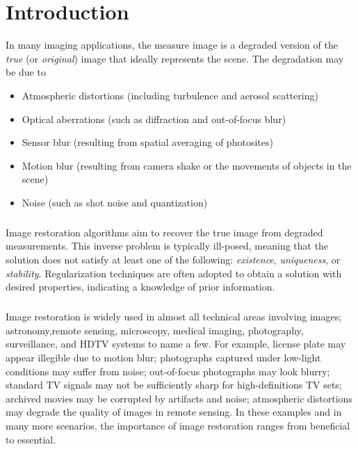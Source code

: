 \documentclass[a4paper]{book}
\begin{document}
	\chapter[\LARGE Introduction]{Introduction}
	\thispagestyle{empty}
	In many imaging applications, the measure image is a degraded version of the \textit{true} (or \textit{original}) image that ideally represents the scene. The degradation may be due to 
	\begin{itemize}
		\item Atmospheric distortions (including turbulence and aerosol scattering)
		\item Optical aberrations (such as diffraction and out-of-focus blur)
		\item Sensor blur (resulting from spatial averaging of photosites)
		\item Motion blur (resulting from camera shake or the movements of objects in the scene)
		\item Noise (such as shot noise and quantization)
	\end{itemize}
	\paragraph*{}Image restoration algorithms aim to recover the true image from degraded measurements. This inverse problem is typically ill-posed, meaning that the solution does not satisfy at least one of the following: \textit{existence}, \textit{uniqueness}, or \textit{stability}. Regularization techniques are often adopted to obtain a solution with desired properties, indicating a knowledge of prior information.
	\paragraph*{}Image restoration is widely used in almost all technical areas involving images; astronomy,remote sensing, microscopy, medical imaging, photography, surveillance, and HDTV systems to name a few. For example, license plate may appear illegible due to motion blur; photographs captured under low-light conditions may suffer from noise; out-of-focus photographs may look blurry; standard TV signals may not be sufficiently sharp for high-definitions TV sets; archived movies may be corrupted by artifacts and noise; atmospheric distortions may degrade the quality of images in remote sensing. In these examples and in many more scenarios, the importance of image restoration ranges from beneficial to essential.
	
\end{document}
